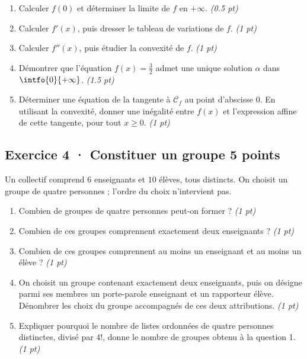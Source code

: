 \begin{enumerate}

\item Calculer $f(0)$ et déterminer la limite de $f$ en $+\infty$. \hfill\textit{(\num{0,5} pt)}

\item Calculer $f' (x)$, puis dresser le tableau de variations de $f$. \hfill\textit{(1 pt)}

\item Calculer $f'' (x)$, puis étudier la convexité de $f$. \hfill\textit{(1 pt)}

\item Démontrer que l'équation $f(x)=\frac{3}{2}$ admet une unique solution $\alpha$ dans $\intfo{0}{+\infty}$. \hfill\textit{(\num{1,5} pt)}

\item Déterminer une équation de la tangente à $\mathcal C_f$ au point d'abscisse $0$. En utilisant la convexité, donner une inégalité entre $f(x)$ et l'expression affine de cette tangente, pour tout $x\ge0$. \hfill\textit{(1 pt)}

\end{enumerate}

\subsection*{Exercice 4 · Constituer un groupe \hfill 5 points}Un collectif comprend $6$ enseignants et $10$ élèves, tous distincts. On choisit un groupe de quatre personnes ; l'ordre du choix n'intervient pas.

\begin{enumerate}

\item Combien de groupes de quatre personnes peut-on former ? \hfill\textit{(1 pt)}

\item Combien de ces groupes comprennent exactement deux enseignants ? \hfill\textit{(1 pt)}

\item Combien de ces groupes comprennent au moins un enseignant et au moins un élève ? \hfill\textit{(1 pt)}

\item On choisit un groupe contenant exactement deux enseignants, puis on désigne parmi ses membres un porte-parole enseignant et un rapporteur élève. Dénombrer les choix du groupe accompagnés de ces deux attributions. \hfill\textit{(1 pt)}

\item Expliquer pourquoi le nombre de listes ordonnées de quatre personnes distinctes, divisé par $4!$, donne le nombre de groupes obtenu à la question 1. \hfill\textit{(1 pt)}

\end{enumerate}


